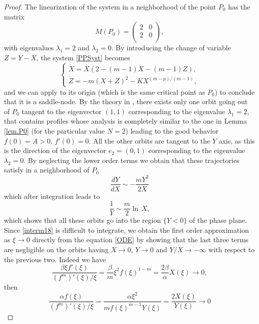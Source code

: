 \documentclass[a4paper,11pt]{article}
\numberwithin{equation}{section}
\begin{document}
\begin{proof}
The linearization of the system in a neighborhood of the point $P_0$ has the matrix
$$
M(P_0)=\left(
  \begin{array}{cc}
    2 & 0 \\
    2 & 0 \\
  \end{array}
\right),
$$
with eigenvalues $\lambda_1=2$ and $\lambda_2=0$. By introducing the change of variable $Z=Y-X$, the system \eqref{PPSyst} becomes
\begin{equation}\label{PPSyst.N2}
\left\{\begin{array}{ll}\dot{X}=X(2-(m-1)X-(m-1)Z),\\ \dot{Z}=-m(X+Z)^2-KX^{(m-p)/(m-1)},\end{array}\right.
\end{equation}
and we can apply \cite[Theorem 1, Section 2.11]{Pe} to its origin (which is the same critical point as $P_0$) to conclude that it is a saddle-node. By the theory in \cite[Section 3.4]{GH}, there exists only one orbit going out of $P_0$ tangent to the eigenvector $(1,1)$ corresponding to the eigenvalue $\lambda_1=2$, that contains profiles whose analysis is completely similar to the one in Lemma \ref{lem.P0} (for the particular value $N=2$) leading to the good behavior $f(0)=A>0$, $f'(0)=0$. All the other orbits are tangent to the $Y$ axis, as this is the direction of the eigenvector $e_2=(0,1)$ corresponding to the eigenvalue $\lambda_2=0$. By neglecting the lower order terms we obtain that these trajectories satisfy in a neighborhood of $P_0$
$$
\frac{dY}{dX}\sim-\frac{mY^2}{2X}
$$
which after integration leads to
\begin{equation}\label{interm18}
\frac{1}{Y}\sim\frac{m}{2}\ln\,X,
\end{equation}
which shows that all these orbits go into the region $\{Y<0\}$ of the phase plane. Since \eqref{interm18} is difficult to integrate, we obtain the first order approximation as $\xi\to0$ directly from the equation \eqref{ODE} by showing that the last three terms are negligible on the orbits having $X\to0$, $Y\to0$ and $Y/X\to-\infty$ with respect to the previous two. Indeed we have
\begin{equation}\label{interm19}
\frac{\beta\xi f'(\xi)}{(f^m)'(\xi)/\xi}=\frac{\beta}{m}\xi^{2}f(\xi)^{1-m}=\frac{2\beta}{\alpha}X(\xi)\to0,
\end{equation}
then
\begin{equation}\label{interm20}
\frac{\alpha f(\xi)}{(f^m)'(\xi)/\xi}=\frac{\alpha\xi^2}{mf(\xi)^{m-1}Y(\xi)}=\frac{2X(\xi)}{Y(\xi)}\to0

\end{equation}
\end{proof}
\end{document}
